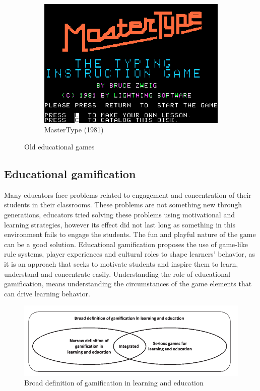 \documentclass[../main.tex]{subfiles}
\begin{document}
\begin{figure}
\begin{subfigure}[b]{0.3\textwidth}
         \centering
         \includegraphics[width=\textwidth]{images/chapter1/old_games/MasterType.png}
         \caption{MasterType (1981)}
         \label{fig:MasterType (1981)}
     \end{subfigure}
        \caption{Old educational games}
        \label{fig:Old educational games}
\end{figure}

\subsection{Educational gamification}
Many educators face problems related to engagement and concentration of their students in their classrooms. These problems are not something new through generations, educators tried solving these problems using motivational and learning  strategies, however its effect did not last long as something in this environment fails to engage the students. The fun and playful nature of the game can be a good solution. 
Educational gamification proposes the use of game-like rule systems, player experiences and cultural roles to shape learners’ behavior, as it is an approach that seeks to motivate students and inspire them to learn, understand and concentrate easily. Understanding the role of educational gamification, means understanding the circumstances of the game elements that can drive learning behavior.
\begin{figure}[ht]
\centering
\includegraphics[scale=0.5]{images/chapter1/Broad definition of gamification in learning and education.png}
\caption{Broad definition of gamification in learning and education}
\label{fig:Broad definition of gamification in learning and education}
\end{figure}
\end{document}
